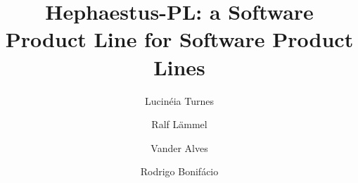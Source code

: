 \documentclass[preprint,12pt]{elsarticle}
\newcommand{\hpl}{\textsf{Hephaestus-PL}}
\begin{document}
\begin{frontmatter}



\title{\hpl: a Software Product Line for Software Product Lines}


\author[unb]{Lucin\'{e}ia Turnes}
\author[ukob]{Ralf L\"{a}mmel}
\author[unb]{Vander Alves}
\author[unb]{Rodrigo Bonif\'{a}cio}

\address[unb]{Departamento de Ci\^{e}ncia da Computa\c{c}\~{a}o, Universidade de Bras\'{i}lia, Campus Darcy Ribeiro, Bras\'{i}lia, Brazil, 70910-900}
\address[ukob]{Software Languages Team, Universit\"{a}t Koblenz-Landau, Institut f\"{u}r Informatik, Universittsstrae 1, D-56070 Koblenz, Germany}

\author{}

\address{}

\begin{abstract}


\end{abstract}
\end{frontmatter}
\end{document}
